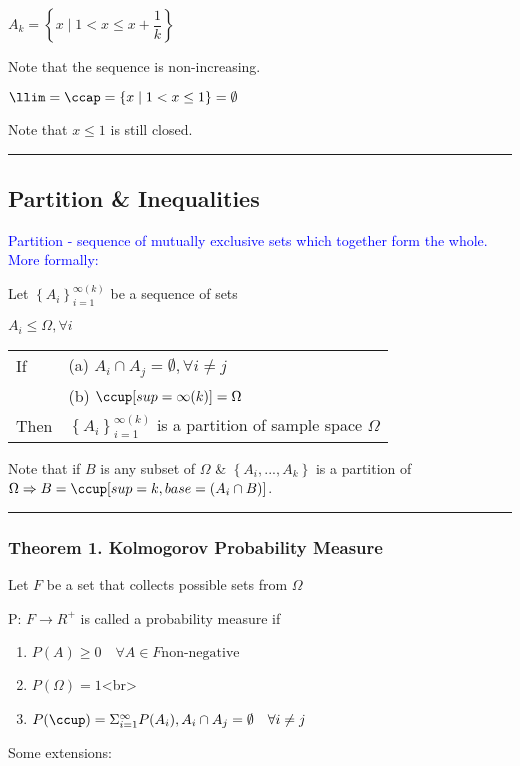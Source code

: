 \documentclass[12pt]{article}
\newcommand{\ddef}[1]{\textcolor{blue}{#1}}
\newcommand{\braces}[1]{\left\{#1\right\}}
\newcommand{\divider}[0]{\rule{\textwidth}{0.1pt}}
\begin{document}
\(A_k = \braces{x \mid 1 < x \le x + \dfrac{1}{k}}\)

Note that the sequence is non-increasing.

\(\llim = \ccap = \braces{x \mid 1 < x \le 1} = \emptyset\)

Note that \(x \le 1\) is still closed.

\divider

\subsection{Partition \& Inequalities}

\ddef{Partition - sequence of mutually exclusive sets which together form the whole. More formally:}

Let \(\braces{A_i}_{i = 1}^{\infty (k)}\) be a sequence of sets

\(A_i \le \Omega, \forall i\)

\begin{tabular}{@{} l l}
If		& (a) \(A_i \cap A_j = \emptyset, \forall i \ne j\) \\
		& (b) \(\ccup[sup=\infty (k)] = \Omega \) \\
Then 	& $\braces{A_i}_{i=1}^{\infty(k)}$ is a partition of sample space $\Omega$
\end{tabular}

Note that if $B$ is any subset of $\Omega$ \& $\braces{A_i, ..., A_k}$ is a partition of $\Omega \Rightarrow B = \ccup[sup=k, base=(A_i \cap B)]$.

\divider

\subsubsection{Theorem 1. Kolmogorov Probability Measure}

Let \(F\) be a set that collects possible sets from \(\Omega\)

P: \(F \rightarrow R^+\) is called a probability measure if

\begin{enumerate}[label=(\alph*)]
	\item \(P(A) \ge 0 \quad \forall A \in F \text{non-negative}\)
	\item \(P(\Omega) = 1\)<br>
	\item \(P(\ccup) = \Sigma_{i=1}^{\infty} P(A_i), A_i \cap A_j = \emptyset \quad \forall i \ne j\)
\end{enumerate}

Some extensions:
\end{document}
